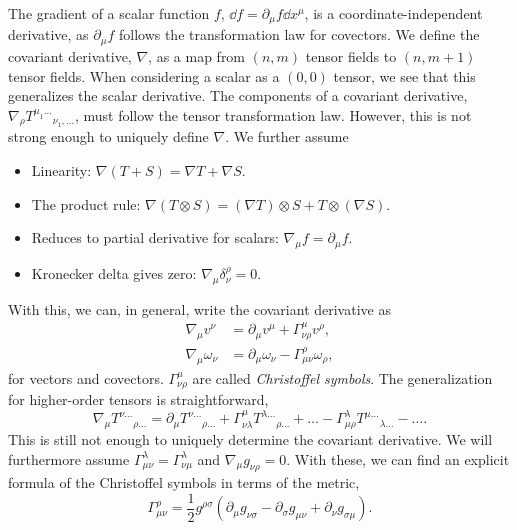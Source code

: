 The gradient of a scalar function $f$, $\dd f = \partial_\mu f \dd x^\mu$, is a coordinate-independent derivative, as $\partial_\mu f$ follows the transformation law for covectors.
We define the covariant derivative, $\nabla$, as a map from $(n, m)$ tensor fields to $(n, m+1)$ tensor fields.
When considering a scalar as a $(0, 0)$ tensor, we see that this generalizes the scalar derivative.
The components of a covariant derivative, $\nabla_\rho T^{\mu_1\dots}{}_{\nu_1, \dots}$, must follow the tensor transformation law. 
However, this is not strong enough to uniquely define $\nabla$.
We further assume
%
\begin{itemize}
    \item Linearity: $\nabla (T + S) = \nabla T + \nabla S$.
    \item The product rule: $\nabla (T \otimes S) = (\nabla T)\otimes S + T \otimes (\nabla S)$.
    \item Reduces to partial derivative for scalars: $\nabla_\mu f = \partial_\mu f$.
    \item Kronecker delta gives zero: $\nabla_\mu \delta^\rho_\nu = 0$.
\end{itemize}
%
With this, we can, in general, write the covariant derivative as~\autocite{carrollSpacetimeGeometryIntroduction2019}
%
\begin{align}
    \label{covariant derivative diff geom}
    \nabla_\mu v^\nu &= \partial_\mu v^\mu + \Gamma^\mu_{\nu \rho} v^\rho, \\
    \label{covariant derivative diff geom covector}
    \nabla_\mu \omega_\nu &= \partial_\mu \omega_\nu - \Gamma^\rho_{\mu \nu} \omega_\rho,
\end{align}
%
for vectors and covectors.
$\Gamma^{\mu}_{\nu \rho}$ are called \emph{Christoffel symbols}.
The generalization for higher-order tensors is straightforward, 
%
\begin{equation}
    \nabla_\mu T^{\nu\dots}{}_{\rho\dots}
    =
    \partial_\mu T^{\nu\dots}{}_{\rho\dots}
    + \Gamma^\mu_{\nu \lambda} T^{\lambda\dots}{}_{\rho\dots} +\dots
    - \Gamma^\lambda_{\mu \rho} T^{\mu\dots}{}_{\lambda\dots} -\dots.
\end{equation} 
%
This is still not enough to uniquely determine the covariant derivative.
We will furthermore assume $\Gamma^{\lambda}_{\mu \nu} = \Gamma^{\lambda}_{\nu \mu}$ and $\nabla_\mu g_{\nu \rho} = 0$.
With these, we can find an explicit formula of the Christoffel symbols in terms of the metric,
%
\begin{equation}
    \label{christoffel symbols from metric}
    \Gamma^\rho_{\mu \nu} = \frac{1}{2} g^{\rho \sigma} (\partial_\mu g_{\nu \sigma} - \partial_\sigma g_{\mu \nu} + \partial_{\nu}g_{\sigma \mu}).
\end{equation}

